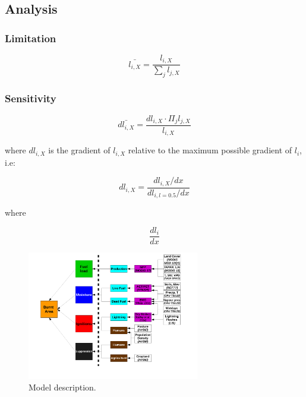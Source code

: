 \documentclass[12pt]{article}
\begin{document}
\subsection{Analysis}

\subsubsection{Limitation}

\begin{equation}
    \bar{l_{i, X}} = \frac{l_{i, X}}{\sum_{j} l_{j, X}}
\end{equation}

\subsubsection{Sensitivity}

\begin{equation}
    \bar{dl_{i, X}} = \frac{dl_{i, X} \cdot \Pi_{j} l_{j, X}}{l_{i, X}}
\end{equation}

where $dl_{i, X}$ is the gradient of $l_{i, X}$ relative to the maximum possible gradient of $l_{i}$, i.e:

\begin{equation}
    dl_{i, X} = \frac{dl_{i, X} / dx}{dl_{i, l = 0.5} / dx}
\end{equation}

where

\begin{equation}
    \frac{dl_{i}}{dx}
\end{equation}

\begin{figure}[!ht]
  \centering
    \includegraphics[width=0.67\textwidth]{Model_schematic.pdf}
  \caption{Model description.}
\end{figure}
\end{document}
